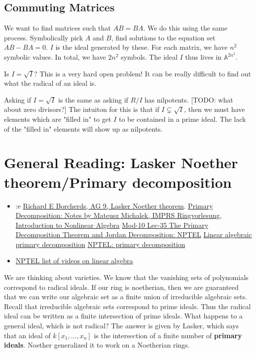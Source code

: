 \documentclass{book}
\newcommand{\A}{\ensuremath{\mathbb{A}}}
\newcommand{\rad}{\sqrt} %
\theoremstyle{definition}
\begin{document}
\section{Commuting Matrices}
We want to find matrices such that $AB = BA$. We do this using the
same process. Symbolically pick $A$ and $B$, find solutions to the equation
set $AB - BA = 0$. $I$ is the ideal generated by these. For each 
matrix, we have $n^2$ symbolic values. In total, we have $2n^2$ symbols.
The ideal $I$ thus lives in $\A^{2n^2}$.

Is $I = \rad{I}$? This is a very hard open problem! It can be really difficult
to find out what the radical of an ideal is.

Asking if $I = \rad{I}$ is the same as asking if $R/I$ has nilpotents.
[TODO: what about zero divisors?]
The intuiton for this is that if $I \subsetneq \rad{I}$, then we must have
elements which are "filled in" to get $I$ to be contained in a prime ideal.
The lack of the "filled in" elements will show up as nilpotents.

\chapter{General Reading: Lasker Noether theorem/Primary decomposition}
\begin{itemize}
\item :e
\href{https://www.youtube.com/watch?v=6ntEZebfmu0&list=PL8yHsr3EFj53j51FG6wCbQKjBgpjKa5PX&index=9}{Richard E Borcherds, AG 9, Lasker Noether theorem}.
\href{https://personal-homepages.mis.mpg.de/michalek/july03.pdf}{Primary Decomposition:
Notes by Mateusz Michalek, IMPRS Ringvorlesung, Introduction to Nonlinear Algebra}
\href{https://www.youtube.com/watch?v=nV7JC2RbwU0}{Mod-10 Lec-35 The Primary Decomposition Theorem and Jordan Decomposition: NPTEL}
\href{http://math.kangwon.ac.kr/~yhpark/webla/lin-alg/node8.html}{Linear algebraic primary decomposition}
\href{https://www.youtube.com/watch?v=DcY8tdVQYtc}{NPTEL: primary decomposition}
\item \href{https://www.nptelvideos.com/course.php?id=725}{NPTEL list of videos on linear algebra}
\end{itemize}

We are thinking about varieties. 
We know that the vanishing sets of polynomials correspond to radical ideals.
If our ring is noetherian, then we are guaranteed that we can write
our algebraic set as a finite union of irreducible algebraic sets. Recall
that irreducible algebraic sets correspond to prime ideals. Thus
the radical ideal can be written as a finite intersection of prime ideals.
What happens to a general ideal, which is not radical? The answer is
given by Lasker, which says that an ideal of $k[x_1, \dots, x_n]$ is
the intersection of a finite number of \textbf{primary ideals}. 
Noether generalized it to work on a Noetherian rings.
\end{document}
